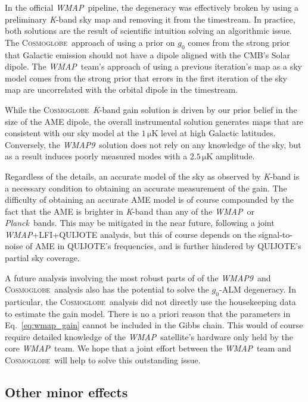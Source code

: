 \documentclass[twocolumn]{../../common/aa}
\def\WMAP{\emph{WMAP}}
\def\WMAPnine{\emph{WMAP9}}
\def\Planck{\emph{Planck}}
\newcommand{\cosmoglobe}{\textsc{Cosmoglobe}}
\newcommand{\K}[0]{\textit K}
\begin{document}
In the official \WMAP\ pipeline, the degeneracy was effectively broken by using a preliminary \K-band sky map and removing it from the timestream.  In practice, both solutions are the result of scientific intuition solving an algorithmic issue. The \cosmoglobe\ approach of using a prior on $g_0$ comes from the strong prior that Galactic emission should not have a dipole aligned with the CMB's Solar dipole. The \WMAP\ team's approach of using a previous iteration's map as a sky model comes from the strong prior that errors in the first iteration of the sky map are uncorrelated with the orbital dipole in the timestream.

While the \cosmoglobe\ \K-band gain solution is driven by our prior belief in the size of the AME dipole, the overall instrumental solution generates maps that are consistent with our sky model at the $1\,\mathrm{\mu K}$ level at high Galactic latitudes. Conversely, the \WMAPnine\ solution does not rely on any knowledge of the sky, but as a result induces poorly measured modes with a $2.5\,\mathrm{\mu K}$ amplitude. 

Regardless of the details, an accurate model of the sky as observed by \K-band is a necessary condition to obtaining an accurate measurement of the gain. The difficulty of obtaining an accurate AME model is of course compounded by the fact that the AME is brighter in \K-band than any of the \WMAP\ or \Planck\ bands. This may be mitigated in the near future, following a joint \WMAP+LFI+QUIJOTE analysis, but this of course depends on the signal-to-noise of AME in QUIJOTE's frequencies, and is further hindered by QUIJOTE's partial sky coverage.

A future analysis involving the most robust parts of of the \WMAPnine\ and \cosmoglobe\ analysis also has the potential to solve the $g_0$-ALM degeneracy. In particular, the \cosmoglobe\ analysis did not directly use the housekeeping data to estimate the gain model. There is no a priori reason that the parameters in Eq.~\eqref{eq:wmap_gain} cannot be included in the Gibbs chain. This would of course require detailed knowledge of the \WMAP\ satellite's hardware only held by the core \WMAP\ team. We hope that a joint effort between the \WMAP\ team and \cosmoglobe\ will help to solve this outstanding issue.




\subsection{Other minor effects}
\label{sec:minor}
\end{document}
